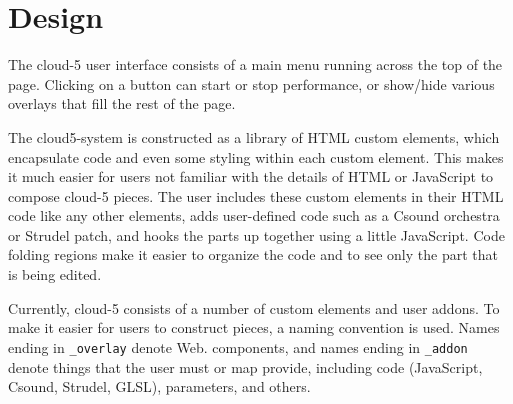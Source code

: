\documentclass[runningheads,a4paper]{llncs}
\begin{document}
\section{Design}

The cloud-5 user interface consists of a main menu running across the top of the page. Clicking on a button can start or stop performance, or show/hide various overlays that fill the rest of the page. 

The cloud5-system is constructed as a library of HTML custom elements, which encapsulate code and even some styling within each custom element. This makes it much easier for users not familiar with the details of HTML or JavaScript to compose cloud-5 pieces. The user includes these custom elements in their HTML code like any other elements, adds user-defined code such as a Csound orchestra or Strudel patch, and hooks the parts up together using a little JavaScript. Code folding regions make it easier to organize the code and to see only the part that is being edited. 

Currently, cloud-5 consists of a number of custom elements and user addons. To make it easier for users to construct pieces, a naming convention is used. Names ending in \texttt{\_overlay} denote Web. components, and names ending in \texttt{\_addon} denote things that the user must or map provide, including code (JavaScript, Csound, Strudel, GLSL), parameters, and others.
\end{document}
